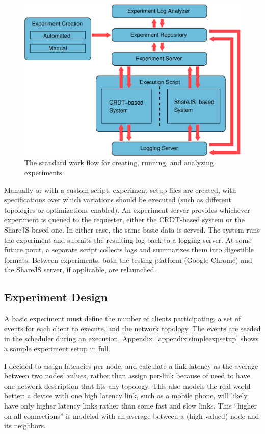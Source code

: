 \documentclass[12pt,a4paper,twoside,openright]{report}
\begin{document}
	\begin{figure}[htb]
	\centering
	\includegraphics[width=1\linewidth]{figs/workflow.eps}
	\caption[Workflow]{The standard work flow for creating, running, and analyzing experiments.}
	\label{fig:workflow}
	\end{figure}
	
	Manually or with a custom script, experiment setup files are created, with specifications over which variations should be executed (such as different topologies or optimizations enabled). An experiment server provides whichever experiment is queued to the requester, either the CRDT-based system or the ShareJS-based one. In either case, the same basic data is served. The system runs the experiment and submits the resulting log back to a logging server. At some future point, a separate script collects logs and summarizes them into digestible formats. Between experiments, both the testing platform (Google Chrome) and the ShareJS server, if applicable, are relaunched.

	\subsection{Experiment Design}
	
	A basic experiment must define the number of clients participating, a set of events for each client to execute, and the network topology. The events are seeded in the scheduler during an execution. Appendix~\ref{appendix:simpleexpsetup} shows a sample experiment setup in full.

	I decided to assign latencies per-node, and calculate a link latency as the average between two nodes' values, rather than assign per-link because of need to have one network description that fits any topology. This also models the real world better: a device with one high latency link, such as a mobile phone, will likely have only higher latency links rather than some fast and slow links. This ``higher on all connections'' is modeled with an average between a (high-valued) node and its neighbors.
\end{document}
